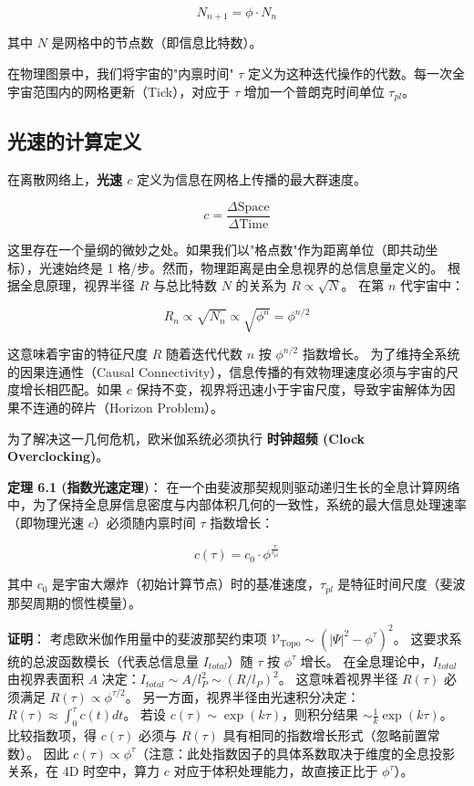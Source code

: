 \[N_{n+1} = \phi \cdot N_n\]

其中 $N$ 是网格中的节点数（即信息比特数）。

在物理图景中，我们将宇宙的"内禀时间" $\tau$ 定义为这种迭代操作的代数。每一次全宇宙范围内的网格更新（Tick），对应于 $\tau$ 增加一个普朗克时间单位 $\tau_{pl}$。

\subsection{光速的计算定义}

在离散网络上，\textbf{光速 $c$} 定义为信息在网格上传播的最大群速度。

\[c = \frac{\Delta \text{Space}}{\Delta \text{Time}}\]

这里存在一个量纲的微妙之处。如果我们以"格点数"作为距离单位（即共动坐标），光速始终是 1 格/步。然而，物理距离是由全息视界的总信息量定义的。
根据全息原理，视界半径 $R$ 与总比特数 $N$ 的关系为 $R \propto \sqrt{N}$。
在第 $n$ 代宇宙中：

\[R_n \propto \sqrt{N_n} \propto \sqrt{\phi^n} = \phi^{n/2}\]

这意味着宇宙的特征尺度 $R$ 随着迭代代数 $n$ 按 $\phi^{n/2}$ 指数增长。
为了维持全系统的因果连通性（Causal Connectivity），信息传播的有效物理速度必须与宇宙的尺度增长相匹配。如果 $c$ 保持不变，视界将迅速小于宇宙尺度，导致宇宙解体为因果不连通的碎片（Horizon Problem）。

为了解决这一几何危机，欧米伽系统必须执行 \textbf{时钟超频 (Clock Overclocking)}。

\textbf{定理 6.1 (指数光速定理)}：
在一个由斐波那契规则驱动递归生长的全息计算网络中，为了保持全息屏信息密度与内部体积几何的一致性，系统的最大信息处理速率（即物理光速 $c$）必须随内禀时间 $\tau$ 指数增长：

\[c(\tau) = c_0 \cdot \phi^{\frac{\tau}{\tau_{pl}}}\]

其中 $c_0$ 是宇宙大爆炸（初始计算节点）时的基准速度，$\tau_{pl}$ 是特征时间尺度（斐波那契周期的惯性模量）。

\textbf{证明}：
考虑欧米伽作用量中的斐波那契约束项 $\mathcal{V}_{\text{Topo}} \sim (|\Psi|^2 - \phi^\tau)^2$。
这要求系统的总波函数模长（代表总信息量 $I_{total}$）随 $\tau$ 按 $\phi^\tau$ 增长。
在全息理论中，$I_{total}$ 由视界表面积 $A$ 决定：$I_{total} \sim A/l_P^2 \sim (R/l_P)^2$。
这意味着视界半径 $R(\tau)$ 必须满足 $R(\tau) \propto \phi^{\tau/2}$。
另一方面，视界半径由光速积分决定：$R(\tau) \approx \int_0^\tau c(t) dt$。
若设 $c(\tau) \sim \exp(k\tau)$，则积分结果 $\sim \frac{1}{k}\exp(k\tau)$。
比较指数项，得 $c(\tau)$ 必须与 $R(\tau)$ 具有相同的指数增长形式（忽略前置常数）。
因此 $c(\tau) \propto \phi^{\tau}$（注意：此处指数因子的具体系数取决于维度的全息投影关系，在 4D 时空中，算力 $c$ 对应于体积处理能力，故直接正比于 $\phi^\tau$）。

